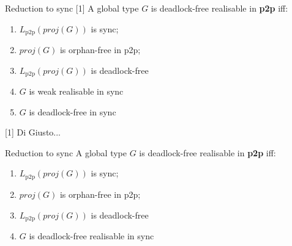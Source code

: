 \documentclass{beamer}
\begin{document}



\begin{frame}{Reduction to sync [1]}
	\vspace{1.5cm}
	A global type $G$ is deadlock-free realisable in \textbf{p2p} iff:
	\begin{enumerate}
		\item $L_{\text{p2p}}(proj(G))$ is sync;
		\item $proj(G)$ is orphan-free in p2p; %
		\item $L_{\text{p2p}}(proj(G))$ is deadlock-free
		\item $G$ is weak realisable in sync
		\item $G$ is deadlock-free in sync
	\end{enumerate}
	
	\vspace{1.5cm}

	\small [1] Di Giusto...
\end{frame}

\begin{frame}{Reduction to sync}
	A global type $G$ is deadlock-free realisable in \textbf{p2p} iff:
	\begin{enumerate}
		\item $L_{\text{p2p}}(proj(G))$ is sync;
		\item $proj(G)$ is orphan-free in p2p; %
		\item $L_{\text{p2p}}(proj(G))$ is deadlock-free 
		\item $G$ is deadlock-free realisable in sync \hspace{4mm} \scalebox{1.5}{{\color{red}$\longleftarrow$}}
	\end{enumerate}
\end{frame}
\end{document}
